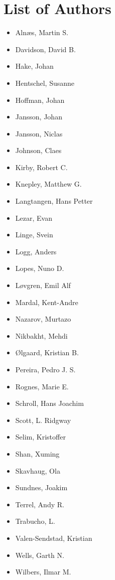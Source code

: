 \chapter*{List of Authors}


\begin{itemize}
\item
  Aln{\ae}s, Martin S.
\item
  Davidson, David B.
\item
  Hake, Johan
\item
  Hentschel, Susanne
\item
  Hoffman, Johan
\item
  Jansson, Johan
\item
  Jansson, Niclas
\item
  Johnson, Claes
\item
  Kirby, Robert C.
\item
  Knepley, Matthew G.
\item
  Langtangen, Hans Petter
\item
  Lezar, Evan
\item
  Linge, Svein
\item
  Logg, Anders
\item
  Lopes, Nuno D.
\item
  L{\o}vgren, Emil Alf
\item
  Mardal, Kent-Andre
\item
  Nazarov, Murtazo
\item
  Nikbakht, Mehdi
\item
  \O{}lgaard, Kristian B.
\item
  Pereira, Pedro J. S.
\item
  Rognes, Marie E.
\item
  Schroll, Hans Joachim
\item
  Scott, L. Ridgway
\item
  Selim, Kristoffer
\item
  Shan, Xuming
\item
  Skavhaug, Ola
\item
  Sundnes, Joakim
\item
  Terrel, Andy R.
\item
  Trabucho, L.
\item
  Valen-Sendstad, Kristian
\item
  Wells, Garth N.
\item
  Wilbers, Ilmar M.
\end{itemize}

